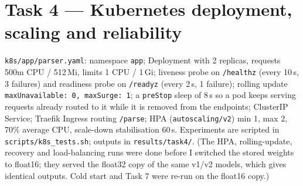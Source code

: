 \documentclass[10pt,a4paper]{article}
\newcommand{\code}[1]{\texttt{\small #1}}
\begin{document}
\section{Task 4 --- Kubernetes deployment, scaling and reliability}
\code{k8s/app/parser.yaml}: namespace \code{app}; Deployment with 2 replicas, requests 500m CPU / 512\,Mi, limits
1 CPU / 1\,Gi; liveness probe on \code{/healthz} (every 10\,s, 3 failures) and readiness probe on \code{/readyz}
(every 2\,s, 1 failure); rolling update \code{maxUnavailable: 0, maxSurge: 1}; a \code{preStop} sleep of 8\,s so a
pod keeps serving requests already routed to it while it is removed from the endpoints; ClusterIP Service; Traefik
Ingress routing \code{/parse}; HPA (\code{autoscaling/v2}) min 1, max 2, 70\% average CPU, scale-down
stabilisation 60\,s. Experiments are scripted in \code{scripts/k8s\_tests.sh}; outputs in \code{results/task4/}. (The HPA, rolling-update, recovery and load-balancing runs were done before I switched the stored weights to
float16; they served the float32 copy of the same v1/v2 models, which gives identical outputs. Cold start and
Task 7 were re-run on the float16 copy.)
\end{document}
